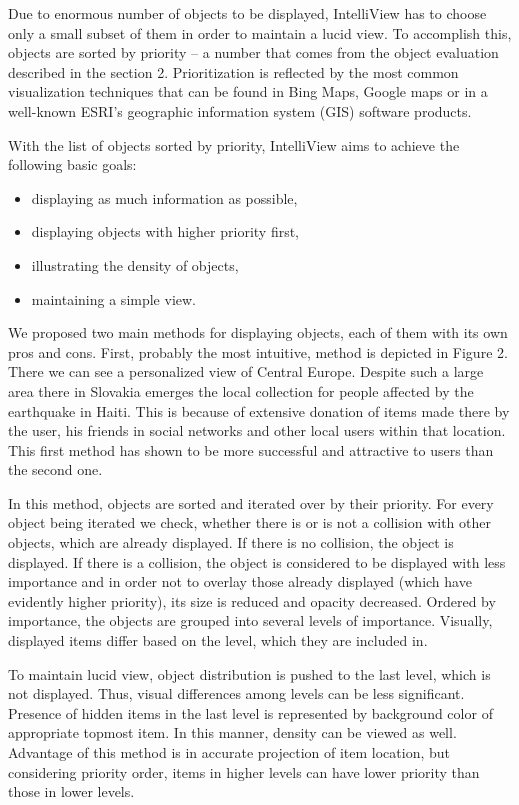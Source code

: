 \documentclass[6pt]{article}
\begin{document}
 

Due to enormous number of objects to be displayed, IntelliView has to choose only a small subset of them in order to maintain a lucid view. To accomplish this, objects are sorted by priority – a number that comes from the object evaluation described in the section 2. Prioritization is reflected by the most common visualization techniques that can be found in Bing Maps, Google maps or in a well-known ESRI’s geographic information system (GIS) software products.

With the list of objects sorted by priority, IntelliView aims to achieve the following basic goals:
\begin{itemize}
\item{displaying as much information as possible,}
\item{displaying objects with higher priority first,}
\item{illustrating the density of objects,}
\item{maintaining a simple view.}
\end{itemize}



We proposed two main methods for displaying objects, each of them with its own pros and cons. First, probably the most intuitive, method is depicted in Figure 2. There we can see a personalized view of Central Europe. Despite such a large area there in Slovakia emerges the local collection for people affected by the earthquake in Haiti. This is because of extensive donation of items made there by the user, his friends in social networks and other local users within that location. This first method has shown to be more successful and attractive to users than the second one.

In this method, objects are sorted and iterated over by their priority. For every object being iterated we check, whether there is or is not a collision with other objects, which are already displayed. If there is no collision, the object is displayed. If there is a collision, the object is considered to be displayed with less importance and in order not to overlay those already displayed (which have evidently higher priority), its size is reduced and opacity decreased. Ordered by importance, the objects are grouped into several levels of importance. Visually, displayed items differ based on the level, which they are included in.

To maintain lucid view, object distribution is pushed to the last level, which is not displayed. Thus, visual differences among levels can be less significant. Presence of hidden items in the last level is represented by background color of appropriate topmost item. In this manner, density can be viewed as well. Advantage of this method is in accurate projection of item location, but considering priority order, items in higher levels can have lower priority than those in lower levels.
\end{document}
